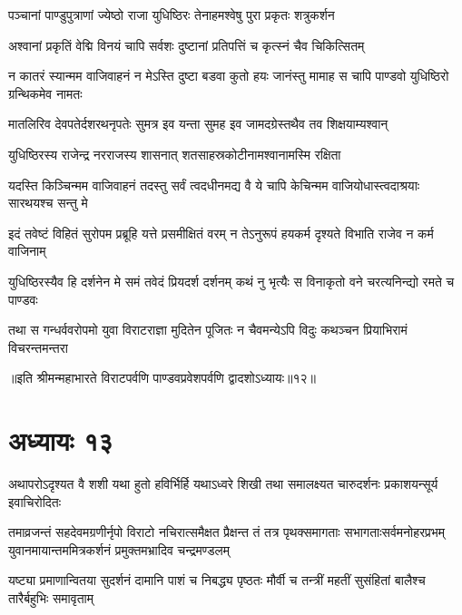


\twolineshloka
{पञ्चानां पाण्डुपुत्राणां ज्येष्ठो राजा युधिष्ठिरः}
{तेनाहमश्वेषु पुरा प्रकृतः शत्रुकर्शन}


\twolineshloka
{अश्वानां प्रकृतिं वेद्मि विनयं चापि सर्वशः}
{दुष्टानां प्रतिपत्तिं च कृत्स्नं चैव चिकित्सितम्}


\twolineshloka
{न कातरं स्यान्मम वाजिवाहनं न मेऽस्ति दुष्टा बडवा कुतो हयः}
{जानंस्तु मामाह स चापि पाण्डवो युधिष्ठिरो ग्रन्थिकमेव नामतः}


\twolineshloka
{मातलिरिव देवपतेर्दशरथनृपतेः सुमत्र इव यन्ता}
{सुमह इव जामदग्रेस्तथैव तव शिक्षयाम्यश्वान्}


\twolineshloka
{युधिष्ठिरस्य राजेन्द्र नरराजस्य शासनात्}
{शतसाहस्रकोटीनामश्वानामस्मि रक्षिता}




\twolineshloka
{यदस्ति किञ्चिन्मम वाजिवाहनं तदस्तु सर्वं त्वदधीनमद्य वै}
{ये चापि केचिन्मम वाजियोधास्त्वदाश्रयाः सारथयश्च सन्तु मे}


\twolineshloka
{इदं तवेष्टं विहितं सुरोपम प्रब्रूहि यत्ते प्रसमीक्षितं वरम्}
{न तेऽनुरूपं हयकर्म दृश्यते विभाति राजेव न कर्म वाजिनाम्}


\twolineshloka
{युधिष्ठिरस्यैव हि दर्शनेन मे समं तवेदं प्रियदर्श दर्शनम्}
{कथं नु भृत्यैः स विनाकृतो वने चरत्यनिन्द्यो रमते च पाण्डवः}



\twolineshloka
{तथा स गन्धर्ववरोपमो युवा विराटराज्ञा मुदितेन पूजितः}
{न चैवमन्येऽपि विदुः कथञ्चन प्रियाभिरामं विचरन्तमन्तरा}

॥इति श्रीमन्महाभारते विराटपर्वणि पाण्डवप्रवेशपर्वणि द्वादशोऽध्यायः॥१२॥

\chapter{अध्यायः १३}

\twolineshloka
{अथापरोऽदृश्यत वै शशी यथा हुतो हविर्भिर्हि यथाऽध्वरे शिखी}
{तथा समालक्ष्यत चारुदर्शनः प्रकाशयन्सूर्य इवाचिरोदितः}


\threelineshloka
{तमाव्रजन्तं सहदेवमग्रणीर्नृपो विराटो नचिरात्समैक्षत}
{प्रैक्षन्त तं तत्र पृथक्समागताः सभागताःसर्वमनोहरप्रभम्}
{युवानमायान्तममित्रकर्शनं प्रमुक्तमभ्रादिव चन्द्रमण्डलम्}


\twolineshloka
{यष्ट्या प्रमाणान्वितया सुदर्शनं दामानि पाशं च निबद्ध्य पृष्ठतः}
{मौर्वी च तन्त्रीं महतीं सुसंहितां बालैश्च तारैर्बहुभिः समावृताम्}


